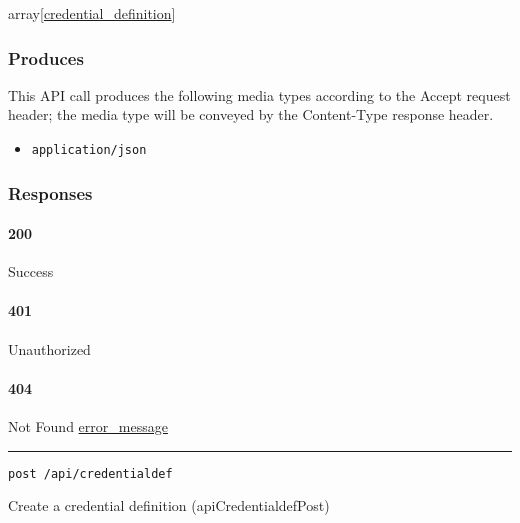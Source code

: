array{[}\protect\hyperlink{credential_definition}{credential\_definition}{]}

\hypertarget{produces-33}{%
\subsubsection{Produces}\label{produces-33}}

This API call produces the following media types according to the
{Accept} request header; the media type will be conveyed by the
{Content-Type} response header.

\begin{itemize}
\tightlist
\item
  \texttt{application/json}
\end{itemize}

\hypertarget{responses-33}{%
\subsubsection{Responses}\label{responses-33}}

\hypertarget{section-111}{%
\paragraph{200}\label{section-111}}

Success

\hypertarget{section-112}{%
\paragraph{401}\label{section-112}}

Unauthorized \protect\hyperlink{}{}

\hypertarget{section-113}{%
\paragraph{404}\label{section-113}}

Not Found \protect\hyperlink{error_message}{error\_message}

\begin{center}\rule{0.5\linewidth}{\linethickness}\end{center}

\protect\hypertarget{apiCredentialdefPost}{}{}

\begin{verbatim}
post /api/credentialdef
\end{verbatim}

Create a credential definition ({apiCredentialdefPost})

